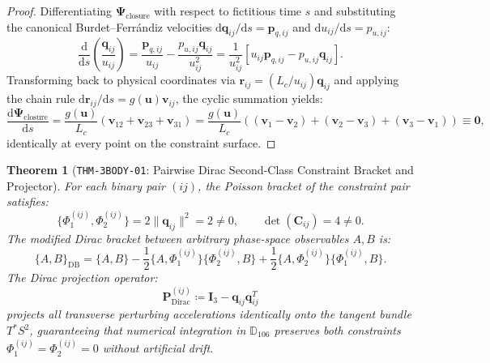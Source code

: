 \documentclass[11pt,a4paper,reqno]{article}
\theoremstyle{plain}
\newtheorem{theorem}{Theorem}[section]
\theoremstyle{definition}
\theoremstyle{remark}
\numberwithin{equation}{section}
\newcommand{\Ddd}{\mathbb{D}_{106}}
\providecommand{\diff}{\mathrm{d}}
\begin{document}
\begin{proof}
Differentiating $\bm{\Psi}_{\mathrm{closure}}$ with respect to fictitious time $s$ and substituting the canonical Burdet--Ferr\'andiz velocities $\diff \mathbf{q}_{ij}/\diff s = \mathbf{p}_{q,ij}$ and $\diff u_{ij}/\diff s = p_{u,ij}$:
\begin{equation}
  \frac{\diff}{\diff s}\left(\frac{\mathbf{q}_{ij}}{u_{ij}}\right) = \frac{\mathbf{p}_{q,ij}}{u_{ij}} - \frac{p_{u,ij} \mathbf{q}_{ij}}{u_{ij}^2} = \frac{1}{u_{ij}^2} \left[ u_{ij} \mathbf{p}_{q,ij} - p_{u,ij} \mathbf{q}_{ij} \right].
\end{equation}
Transforming back to physical coordinates via $\mathbf{r}_{ij} = (L_c/u_{ij}) \mathbf{q}_{ij}$ and applying the chain rule $\diff \mathbf{r}_{ij}/\diff s = g(\mathbf{u}) \mathbf{v}_{ij}$, the cyclic summation yields:
\begin{equation}
  \frac{\diff \bm{\Psi}_{\mathrm{closure}}}{\diff s} = \frac{g(\mathbf{u})}{L_c} \left( \mathbf{v}_{12} + \mathbf{v}_{23} + \mathbf{v}_{31} \right) = \frac{g(\mathbf{u})}{L_c} \left( (\mathbf{v}_1 - \mathbf{v}_2) + (\mathbf{v}_2 - \mathbf{v}_3) + (\mathbf{v}_3 - \mathbf{v}_1) \right) \equiv \mathbf{0},
\end{equation}
identically at every point on the constraint surface.
\end{proof}

\begin{theorem}[\texttt{THM-3BODY-01}: Pairwise Dirac Second-Class Constraint Bracket and Projector]
\label{thm:dirac_bracket_projector}
For each binary pair $(ij)$, the Poisson bracket of the constraint pair satisfies:
\begin{equation}
  \{\Phi_1^{(ij)}, \Phi_2^{(ij)}\} = 2 \|\mathbf{q}_{ij}\|^2 = 2 \ne 0, \qquad \det(\mathbf{C}_{ij}) = 4 \ne 0.
\end{equation}
The modified Dirac bracket between arbitrary phase-space observables $A, B$ is:
\begin{equation}
  \{A, B\}_{\mathrm{DB}} = \{A, B\} - \frac{1}{2} \{A, \Phi_1^{(ij)}\} \{\Phi_2^{(ij)}, B\} + \frac{1}{2} \{A, \Phi_2^{(ij)}\} \{\Phi_1^{(ij)}, B\}.
\end{equation}
The Dirac projection operator:
\begin{equation}
  \mathbf{P}_{\mathrm{Dirac}}^{(ij)} \coloneqq \mathbf{I}_3 - \mathbf{q}_{ij} \mathbf{q}_{ij}^T
  \label{eq:dirac_projector_def}
\end{equation}
projects all transverse perturbing accelerations identically onto the tangent bundle $T^*S^2$, guaranteeing that numerical integration in $\Ddd$ preserves both constraints $\Phi_1^{(ij)} = \Phi_2^{(ij)} = 0$ without artificial drift.
\end{theorem}
\end{document}
